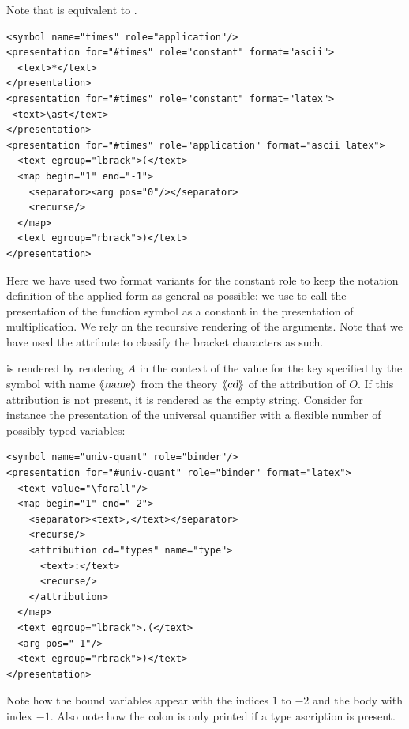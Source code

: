 \documentclass[a4paper]{article}
\def\llquote#1{\ensuremath{\langle\kern-.25em\langle\hbox{\sl{#1}}\rangle\kern-.25em\rangle}}
\begin{document}
Note that { } is equivalent to {}.

\begin{lstlisting}[mathescape,label={lst:multiplication},
                   caption={A Notation Definition for Multiplication}]
<symbol name="times" role="application"/>
<presentation for="#times" role="constant" format="ascii">
  <text>*</text>
</presentation>
<presentation for="#times" role="constant" format="latex">
 <text>\ast</text>
</presentation>
<presentation for="#times" role="application" format="ascii latex">
  <text egroup="lbrack">(</text>
  <map begin="1" end="-1">
    <separator><arg pos="0"/></separator>
    <recurse/>
  </map>
  <text egroup="rbrack">)</text>
</presentation>
\end{lstlisting}
Here we have used two format variants for the constant role to keep the notation
definition of the applied form as general as possible: we use {}
to call the presentation of the function symbol as a constant in the presentation of
multiplication. We rely on the recursive rendering of the arguments. Note that we have
used the {} attribute to classify the bracket characters as
such.

{\snippet{<attribution cd="\llquote{cd}" name="\llquote{name}">A</attribution>}} is
rendered by rendering $A$ in the context of the value for the key specified by the symbol
with name $\llquote{name}$ from the theory {\llquote{cd}} of the attribution of $O$. If
this attribution is not present, it is rendered as the empty string. Consider for instance
the presentation of the universal quantifier with a flexible number of possibly typed
variables:
\begin{lstlisting}[mathescape]
<symbol name="univ-quant" role="binder"/>
<presentation for="#univ-quant" role="binder" format="latex">
  <text value="\forall"/>
  <map begin="1" end="-2">
    <separator><text>,</text></separator>
    <recurse/>
    <attribution cd="types" name="type">
      <text>:</text>
      <recurse/>
    </attribution>
  </map>
  <text egroup="lbrack">.(</text>
  <arg pos="-1"/>
  <text egroup="rbrack">)</text>
</presentation>
\end{lstlisting}
Note how the bound variables appear with the indices $1$ to $-2$ and the body with index
$-1$. Also note how the colon is only printed if a type ascription is present.
\end{document}
